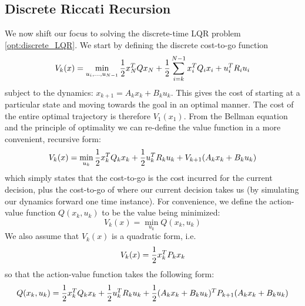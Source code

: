 \documentclass[../root.tex]{subfiles}
\begin{document}
    \subsection{Discrete Riccati Recursion} \label{sec:discrete_LQR}
        We now shift our focus to solving the discrete-time LQR problem
        \eqref{opt:discrete_LQR}. We start by defining the discrete cost-to-go function
        \begin{equation}
            V_k(x) = \min_{u_i,\dots,u_{N-1}} \frac{1}{2} x_N^T Q x_N 
                + \frac{1}{2} \sum_{i=k}^{N-1} x_i^T Q_i x_i + u_i^T R_i u_i
        \end{equation}
        subject to the dynamics: $x_{k+1} = A_k x_k + B_k u_k$. This gives
        the cost of starting at a particular state and moving towards the
        goal in an optimal manner. The cost of the entire optimal trajectory
        is therefore $V_1(x_1)$. From the Bellman equation and the principle
        of optimality we can re-define the value function in a more
        convenient, recursive form:
        \begin{equation}
            V_k(x) = \min_{u_k} \frac{1}{2} x_k^T Q_k x_k 
                + \frac{1}{2} u_k^T R_k u_k 
                + V_{k+1}(A_k x_k + B_k u_k)
        \end{equation}
        which simply states that the cost-to-go is the cost incurred
        for the current decision, plus the cost-to-go of where our current
        decision takes us (by simulating our dynamics forward one time
        instance). For convenience, we define the action-value function
        $Q(x_k,u_k)$ to be the value being minimized:
        \begin{equation}
            V_k(x) = \min_{u_k} Q(x_k,u_k)
        \end{equation}
        We also assume that $V_k(x)$ is a quadratic form, i.e. 
        \begin{equation}
            V_k(x) = \frac{1}{2} x_k^T P_k x_k
        \end{equation}
        so that the action-value function takes the following form:
        \begin{equation} \label{eq:LQR_Q}
            Q(x_k,u_k) = \frac{1}{2} x_k^T Q_k x_k + \frac{1}{2} u_k^T R_k u_k 
                + \frac{1}{2} (A_k x_k + B_k u_k)^T P_{k+1} (A_k x_k + B_k u_k)
        \end{equation}
\end{document}
